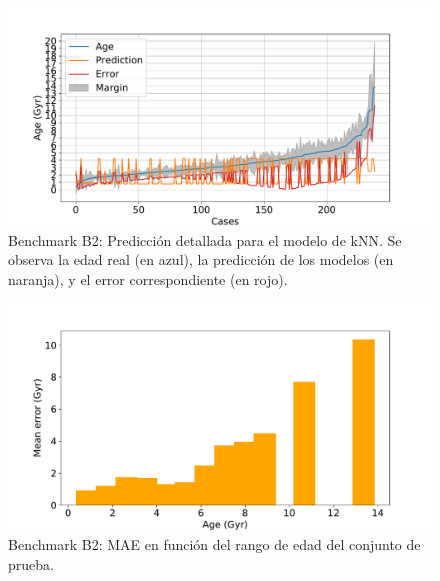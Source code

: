 \begin{figure}[H]
\begin{center}
 \includegraphics[width=0.8\linewidth]{Figuras/Experimentos/B_B2_knn_2.pdf}
\end{center}
\caption{Benchmark B2: Predicción detallada para el modelo de kNN. Se observa la edad real (en azul), la predicción de los modelos (en naranja), y el error correspondiente (en rojo).}
 \label{fig:benchB2_details_knn_2}
\end{figure}

\begin{figure}[H]
\begin{center}
 \includegraphics[width=0.8\linewidth]{Figuras/Experimentos/B_B2_knn_3.pdf}
\end{center}
\caption{Benchmark B2: MAE en función del rango de edad del conjunto de prueba.}
 \label{fig:benchB2_details_knn_3}
\end{figure}


